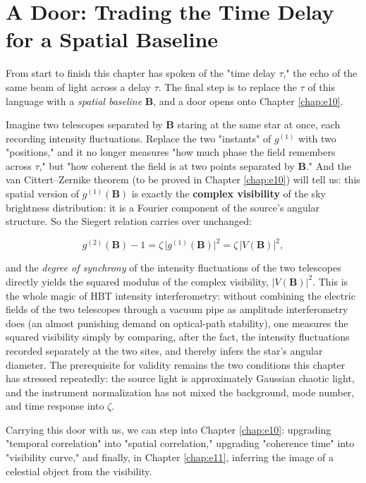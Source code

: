 \section{A Door: Trading the Time Delay for a Spatial Baseline}
\label{sec:e08-gateway}

From start to finish this chapter has spoken of the "time delay \(\tau\)," the echo of the same beam of light across a delay \(\tau\). The final step is to replace the \(\tau\) of this language with a \emph{spatial baseline} \(\bm B\), and a door opens onto Chapter \ref{chap:e10}.

Imagine two telescopes separated by \(\bm B\) staring at the same star at once, each recording intensity fluctuations. Replace the two "instants" of \(g^{(1)}\) with two "positions," and it no longer measures "how much phase the field remembers across \(\tau\)," but "how coherent the field is at two points separated by \(\bm B\)." And the van Cittert--Zernike theorem (to be proved in Chapter \ref{chap:e10}) will tell us: this spatial version of \(g^{(1)}(\bm B)\) is exactly the \textbf{complex visibility} of the sky brightness distribution: it is a Fourier component of the source's angular structure. So the Siegert relation carries over unchanged:

\[
  g^{(2)}(\bm B)-1=\zeta\,\big|g^{(1)}(\bm B)\big|^2
  =\zeta\,\big|V(\bm B)\big|^2 ,
\]

and the \emph{degree of synchrony} of the intensity fluctuations of the two telescopes directly yields the squared modulus of the complex visibility, \(|V(\bm B)|^2\). This is the whole magic of HBT intensity interferometry: without combining the electric fields of the two telescopes through a vacuum pipe as amplitude interferometry does (an almost punishing demand on optical-path stability), one measures the squared visibility simply by comparing, after the fact, the intensity fluctuations recorded separately at the two sites, and thereby infers the star's angular diameter. The prerequisite for validity remains the two conditions this chapter has stressed repeatedly: the source light is approximately Gaussian chaotic light, and the instrument normalization has not mixed the background, mode number, and time response into \(\zeta\).

Carrying this door with us, we can step into Chapter \ref{chap:e10}: upgrading "temporal correlation" into "spatial correlation," upgrading "coherence time" into "visibility curve," and finally, in Chapter \ref{chap:e11}, inferring the image of a celestial object from the visibility.

